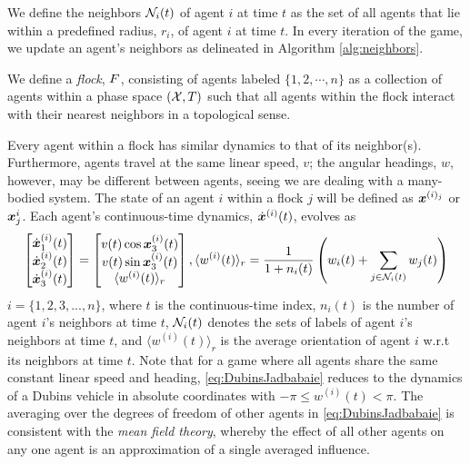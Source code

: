 \begin{definition}
	We define the neighbors $\mathcal{N}_i(t)$ of agent $i$ at time $t$ as the set of all agents that lie within a predefined radius, $r_i$, of agent $i$ at time $t$. In every iteration of the game, we update an agent's neighbors as delineated in Algorithm \ref{alg:neighbors}.
\end{definition}
%
\begin{definition}
	We define a \textit{flock}, $F$, consisting of agents labeled $\{1, 2, \cdots, n\}$  as a collection of agents within a phase space $(\mathcal{X}, T)$ such that all agents within the flock interact with their nearest neighbors in a topological sense.
	\label{def:flock}
\end{definition}
%
\begin{remark}
	Every agent within a flock has similar dynamics to that of its neighbor(s). Furthermore, agents travel at the same linear speed, $v$; the angular headings, $w$, however, may be different between agents, seeing we are dealing with a many-bodied system. The state of an agent $i$ within a flock $j$ will be defined as $\bm{x}^{(i)_j}$ or $\bm{x}^i_j$. Each agent's continuous-time dynamics, $\dot{\bm{x}}^{(i)}(t)$, evolves as
	\begin{align}
	\begin{bmatrix}
		 \dot{\bm{x}}^{(i)}_1(t) \\ \dot{\bm{x}}^{(i)}_2 (t) \\ \dot{\bm{x}}^{(i)}_3 (t)
		\end{bmatrix} 
		= \begin{bmatrix}
			v(t) \cos \bm{x}_3^{(i)}(t) \\ v(t)\sin \bm{x}_3^{(i)}(t) \\ \langle w^{(i)}(t) \rangle_r
		\end{bmatrix},
		 \langle w^{(i)}(t) \rangle_r = \dfrac{1}{1+n_i(t)}\left(w_i(t) + \sum_{j \in \mathcal{N}_i(t)}^{} w_j(t)\right) 
		\label{eq:DubinsJadbabaie}
	\end{align}
	 $i = \{1, 2, 3, ..., n\}$, where $t$ is the continuous-time index, $n_i(t)$ is the number of agent $i$'s neighbors at time $t$, $\mathcal{N}_i(t)$ denotes the sets of labels of  agent $i$'s neighbors at time $t$, and $\langle w^{(i)}(t) \rangle_r$ is the average orientation of agent $i$ w.r.t its neighbors at time $t$. Note that for a game where all agents share the same constant linear speed and heading, \eqref{eq:DubinsJadbabaie} reduces to the dynamics of a Dubins vehicle in absolute coordinates with $-\pi \le w^{(i)}(t) < \pi$. The averaging over the degrees of freedom of other agents in \eqref{eq:DubinsJadbabaie} is consistent with the \textit{mean field theory}, whereby the effect of all other agents on any one agent is an approximation of a single averaged influence.
\end{remark}

